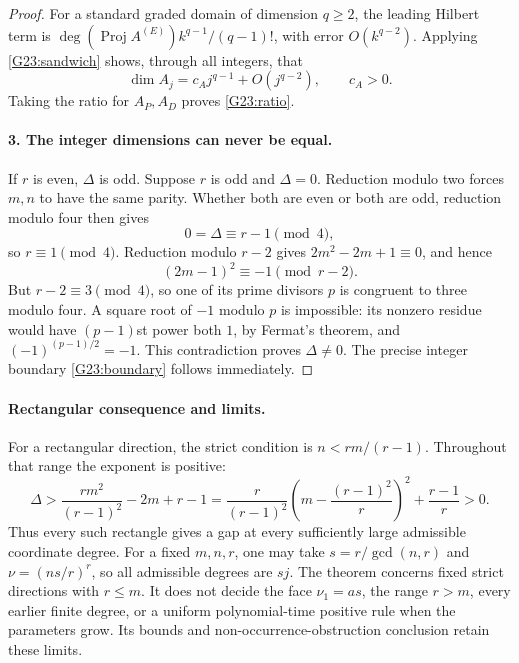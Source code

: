\begin{proof}
For a standard graded domain of dimension $q\ge2$, the
leading Hilbert term is
$\deg(\operatorname{Proj} A^{(E)})k^{q-1}/(q-1)!$,
with error $O(k^{q-2})$. Applying \eqref{G23:sandwich}
shows, through all integers, that
\[
 \dim A_j=c_A j^{q-1}+O(j^{q-2}),\qquad c_A>0.
\]
Taking the ratio for $A_P,A_D$ proves \eqref{G23:ratio}.

\paragraph{3. The integer dimensions can never be equal.}
If $r$ is even, $\Delta$ is odd. Suppose $r$ is odd and
$\Delta=0$. Reduction modulo two forces $m,n$ to have
the same parity. Whether both are even or both are odd,
reduction modulo four then gives
\[
 0=\Delta\equiv r-1\pmod4,
\]
so $r\equiv1\pmod4$. Reduction modulo $r-2$ gives
$2m^2-2m+1\equiv0$, and hence
\[
 (2m-1)^2\equiv-1\pmod{r-2}.
\]
But $r-2\equiv3\pmod4$, so one of its prime divisors
$p$ is congruent to three modulo four. A square root of
$-1$ modulo $p$ is impossible: its nonzero residue would
have $(p-1)$st power both $1$, by Fermat's theorem, and
$(-1)^{(p-1)/2}=-1$. This contradiction proves
$\Delta\ne0$. The precise integer boundary
\eqref{G23:boundary} follows immediately.
\end{proof}

\paragraph{Rectangular consequence and limits.}
For a rectangular direction, the strict condition is
$n<rm/(r-1)$. Throughout that range the exponent is positive:
\[
 \Delta>
 \frac{r m^2}{(r-1)^2}-2m+r-1
 =\frac r{(r-1)^2}\left(m-\frac{(r-1)^2}{r}\right)^2
                                      +\frac{r-1}{r}>0.
\]
Thus every such rectangle gives a gap at every sufficiently
large admissible coordinate degree. For a fixed $m,n,r$,
one may take $s=r/\gcd(n,r)$ and
$\nu=(ns/r)^r$, so all admissible degrees are $sj$.
The theorem concerns fixed strict directions with $r\le m$.
It does not decide the face $\nu_1=as$, the range $r>m$,
every earlier finite degree, or a uniform polynomial-time
positive rule when the parameters grow. Its bounds and
non-occurrence-obstruction conclusion retain these limits.



